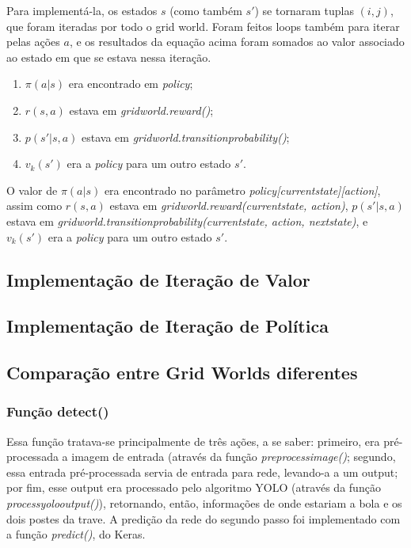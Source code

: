 \documentclass[conference]{IEEEtran}
\begin{document}
Para implementá-la, os estados $s$ (como também $s'$) se tornaram tuplas $(i, j)$, que foram iteradas por todo o grid world. Foram feitos loops também para iterar pelas ações $a$, e os resultados da equação acima foram somados ao valor associado ao estado em que se estava nessa iteração. 

\begin{enumerate}
\item $\pi \left ( a|s \right )$ era encontrado em \textit{policy};

\item $r \left ( s, a \right )$ estava em \textit{grid\underline{\space}world.reward()};

\item $p \left ( s' | s, a \right )$ estava em \textit{grid\underline{\space}world.transition\underline{\space}probability()};

\item $v_k \left ( s' \right )$ era a \textit{policy} para um outro estado $s'$.
\end{enumerate}

O valor de $\pi \left ( a|s \right )$ era encontrado no parâmetro \textit{policy[current\underline{\space}state][action]}, assim como $r \left ( s, a \right )$ estava em \textit{grid\underline{\space}world.reward(current\underline{\space}state, action)}, $p \left ( s' | s, a \right )$ estava em \textit{grid\underline{\space}world.transition\underline{\space}probability(current\underline{\space}state, action, next\underline{\space}state)}, e $v_k \left ( s' \right )$ era a \textit{policy} para um outro estado $s'$.

\subsection{Implementação de Iteração de Valor}

\subsection{Implementação de Iteração de Política}

\subsection{Comparação entre Grid Worlds diferentes}

\subsubsection{Função detect()}
Essa função tratava-se principalmente de três ações, a se saber: primeiro, era pré-processada a imagem de entrada (através da função \textit{preprocess\underline{\space}image()}; segundo, essa entrada pré-processada servia de entrada para rede, levando-a a um output; por fim, esse output era processado pelo algoritmo YOLO (através da função \textit{process\underline{\space}yolo\underline{\space}output()}), retornando, então, informações de onde estariam a bola e os dois postes da trave. A predição da rede do segundo passo foi implementado com a função \textit{predict()}, do Keras.
\end{document}
